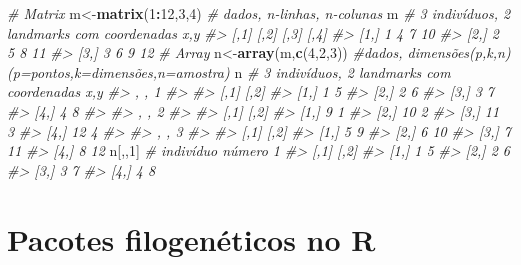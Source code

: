 \documentclass[
]{book}
\newenvironment{Shaded}{\begin{snugshade}}{\end{snugshade}}
\newcommand{\CommentTok}[1]{\textcolor[rgb]{0.56,0.35,0.01}{\textit{#1}}}
\newcommand{\DecValTok}[1]{\textcolor[rgb]{0.00,0.00,0.81}{#1}}
\newcommand{\FunctionTok}[1]{\textcolor[rgb]{0.13,0.29,0.53}{\textbf{#1}}}
\newcommand{\NormalTok}[1]{#1}
\newcommand{\OtherTok}[1]{\textcolor[rgb]{0.56,0.35,0.01}{#1}}
\newcommand{\SpecialCharTok}[1]{\textcolor[rgb]{0.81,0.36,0.00}{\textbf{#1}}}
\begin{document}
\begin{Shaded}
\begin{Highlighting}[]
\CommentTok{\# Matrix }
\NormalTok{m}\OtherTok{\textless{}{-}}\FunctionTok{matrix}\NormalTok{(}\DecValTok{1}\SpecialCharTok{:}\DecValTok{12}\NormalTok{,}\DecValTok{3}\NormalTok{,}\DecValTok{4}\NormalTok{) }\CommentTok{\# dados, n{-}linhas, n{-}colunas }
\NormalTok{m }\CommentTok{\# 3 indivíduos, 2 landmarks com coordenadas x,y }
\CommentTok{\#\textgreater{}      [,1] [,2] [,3] [,4]}
\CommentTok{\#\textgreater{} [1,]    1    4    7   10}
\CommentTok{\#\textgreater{} [2,]    2    5    8   11}
\CommentTok{\#\textgreater{} [3,]    3    6    9   12}
\CommentTok{\# Array }
\NormalTok{n}\OtherTok{\textless{}{-}}\FunctionTok{array}\NormalTok{(m,}\FunctionTok{c}\NormalTok{(}\DecValTok{4}\NormalTok{,}\DecValTok{2}\NormalTok{,}\DecValTok{3}\NormalTok{)) }\CommentTok{\#dados, dimensões(p,k,n) (p=pontos,k=dimensões,n=amostra) }
\NormalTok{n }\CommentTok{\# 3 indivíduos, 2 landmarks com coordenadas x,y }
\CommentTok{\#\textgreater{} , , 1}
\CommentTok{\#\textgreater{} }
\CommentTok{\#\textgreater{}      [,1] [,2]}
\CommentTok{\#\textgreater{} [1,]    1    5}
\CommentTok{\#\textgreater{} [2,]    2    6}
\CommentTok{\#\textgreater{} [3,]    3    7}
\CommentTok{\#\textgreater{} [4,]    4    8}
\CommentTok{\#\textgreater{} }
\CommentTok{\#\textgreater{} , , 2}
\CommentTok{\#\textgreater{} }
\CommentTok{\#\textgreater{}      [,1] [,2]}
\CommentTok{\#\textgreater{} [1,]    9    1}
\CommentTok{\#\textgreater{} [2,]   10    2}
\CommentTok{\#\textgreater{} [3,]   11    3}
\CommentTok{\#\textgreater{} [4,]   12    4}
\CommentTok{\#\textgreater{} }
\CommentTok{\#\textgreater{} , , 3}
\CommentTok{\#\textgreater{} }
\CommentTok{\#\textgreater{}      [,1] [,2]}
\CommentTok{\#\textgreater{} [1,]    5    9}
\CommentTok{\#\textgreater{} [2,]    6   10}
\CommentTok{\#\textgreater{} [3,]    7   11}
\CommentTok{\#\textgreater{} [4,]    8   12}
\NormalTok{n[,,}\DecValTok{1}\NormalTok{] }\CommentTok{\# indivíduo número 1}
\CommentTok{\#\textgreater{}      [,1] [,2]}
\CommentTok{\#\textgreater{} [1,]    1    5}
\CommentTok{\#\textgreater{} [2,]    2    6}
\CommentTok{\#\textgreater{} [3,]    3    7}
\CommentTok{\#\textgreater{} [4,]    4    8}
\end{Highlighting}
\end{Shaded}

\section{Pacotes filogenéticos no R}\label{pacotes-filogenuxe9ticos-no-r}
\end{document}
